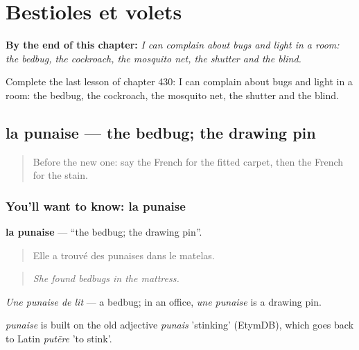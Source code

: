 
\chapter{Bestioles et volets}
\label{ch:fr-bestioles-et-volets}

\begin{chapteropening}
\textbf{By the end of this chapter:} \emph{I can complain about bugs and light in a room: the bedbug, the cockroach, the mosquito net, the shutter and the blind.}

Complete the last lesson of chapter 430: I can complain about bugs and light in a room: the bedbug, the cockroach, the mosquito net, the shutter and the blind.
\end{chapteropening}

\section[la punaise]{la punaise — the bedbug; the drawing pin}

\label{lesson:FR-C430-punaise}



\begin{quote}
Before the new one: say the French for the fitted carpet, then the French for the stain.
\end{quote}

\subsection*{You'll want to know: la punaise}
\textbf{la punaise} — \textquotedblleft{}the bedbug; the drawing pin\textquotedblright{}.

\begin{quote}
Elle a trouvé des punaises dans le matelas.
\end{quote}

\begin{quote}
\emph{She found bedbugs in the mattress.}
\end{quote}

\emph{Une punaise de lit} — a bedbug; in an office, \emph{une punaise} is a drawing pin.

\begin{cousinweb}
\emph{punaise} is built on the old adjective \emph{punais} 'stinking' (EtymDB), which goes back to Latin \emph{putēre} 'to stink'.
\end{cousinweb}

